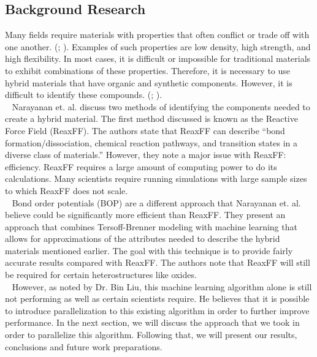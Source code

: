 \documentclass[letterpaper, 12pt]{article}
\begin{document}
\begin{flushleft}

\section*{Background Research}
Many fields require materials with properties that often conflict or trade off with one another. (\cite{Narayanan}; \cite{Ritchie}).  Examples of such properties are low density, high strength, and high flexibility.  In most cases, it is difficult or impossible for traditional materials to exhibit combinations of these properties. Therefore, it is necessary to use hybrid materials that have organic and synthetic components. However, it is difficult to identify these compounds. (\cite{Narayanan}; \cite{Wight}).\\
~\newline
Narayanan et. al. discuss two methods of identifying the components needed to create a hybrid material. The first
method discussed is known as the Reactive Force Field (ReaxFF). The authors state that ReaxFF can describe ``bond formation/dissociation, chemical reaction pathways, and transition states in a diverse class of materials.'' However, they note a major issue with ReaxFF: efficiency. ReaxFF requires a large amount of computing power to do its calculations. Many scientists require running simulations with large sample sizes to which ReaxFF does not scale. \\
~\newline
Bond order potentials (BOP) are a different approach that Narayanan et. al. believe could be significantly more
efficient than ReaxFF. They present an approach that combines Tersoff-Brenner modeling with machine learning that
allows for approximations of the attributes needed to describe the hybrid materials mentioned earlier. The goal
with this technique is to provide fairly accurate results compared with ReaxFF. The authors note that
ReaxFF will still be required for certain heterostructures like oxides. \\
~\newline
However, as noted by Dr. Bin Liu, this machine learning algorithm alone is still not performing as well as 
certain scientists require. He believes that it is possible to introduce parallelization to this existing
algorithm in order to further improve performance. In the next section, we will discuss the approach that we
took in order to parallelize this algorithm.  Following that, we will present our results, conclusions and future work preparations.


\end{flushleft}
\end{document}
